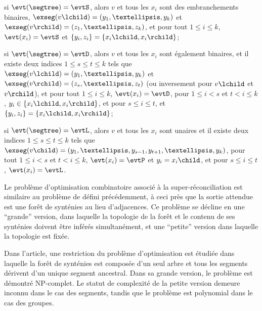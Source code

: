\begin{compactitemize}
    \item si \(\evt(\segtree) = \evtS\), alors
        \(v\) et tous les \(x_i\) sont des embranchements binaires,
        \(\exseg(v\lchild) = (y_1, …, y_k)\) et \(\exseg(v\rchild) = (z_1, …, z_k)\),
        et pour tout \(1 \leq i \leq k\),
        \(\evt(x_i) = \evtS\)
        et \(\{y_i, z_i\} = \{x_i{}\lchild, x_i{}\rchild\}\);
    \item si \(\evt(\segtree) = \evtD\), alors
        \(v\) et tous les \(x_i\) sont également binaires,
        et il existe deux indices \(1 \leq s \leq t \leq k\) tels que
        \(\exseg(v\lchild) = (y_1, …, y_k)\) et \(\exseg(v\rchild) = (z_s, …, z_t)\)
        (ou inversement pour \(v\lchild\) et \(v\rchild\)),
        et pour tout \(1 \leq i \leq k\),
        \(\evt(x_i) = \evtD\),
        pour \(1 \leq i < s\) et \(t < i \leq k\),
        \(y_i \in \{x_i{}\lchild, x_i{}\rchild\}\),
        et pour \(s \leq i \leq t\),
        et \(\{y_i, z_i\} = \{x_i{}\lchild, x_i{}\rchild\}\);
    \item si \(\evt(\segtree) = \evtL\), alors
        \(v\) et tous les \(x_i\) sont unaires et
        il existe deux indices \(1 \leq s \leq t \leq k\) tels que
        \(\exseg(v\child) = (y_1, …, y_{s-1}, y_{t+1}, …, y_k)\),
        pour tout \(1 \leq i < s\) et \(t < i \leq k\),
        \(\evt(x_i) = \evtP\) et
        \(y_i = x_i{}\child\),
        et pour \(s \leq i \leq t\),
        \(\evt(x_i) = \evtL\).
\end{compactitemize}

Le problème d’optimisation combinatoire associé à la super-réconciliation est similaire au problème de
défini précédemment, à ceci près que la sortie attendue est une forêt de synténies au lieu d’adjacences.
Ce problème se décline en une \enquote{grande} version, dans laquelle la topologie de la forêt et le contenu de ses synténies doivent être inférés simultanément, et une \enquote{petite} version dans laquelle la topologie est fixée.

Dans l’article, une restriction du problème d’optimisation est étudiée dans laquelle la forêt de synténies est composée d’un seul arbre et tous les segments dérivent d’un unique segment ancestral.
Dans sa grande version, le problème est démontré NP-complet.
Le statut de complexité de la petite version demeure inconnu dans le cas des segments, tandis que le problème est polynomial dans le cas des groupes.

